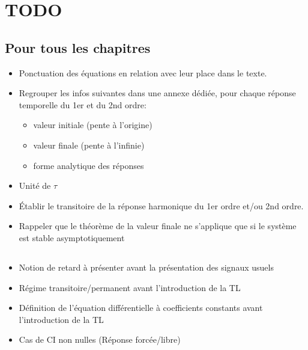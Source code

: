 \chapter{TODO}

\section*{Pour tous les chapitres}
\begin{itemize}
\item Ponctuation des équations en relation avec leur place dans le texte.
\item Regrouper les infos suivantes dans une annexe dédiée, pour chaque réponse temporelle du 1er et du 2nd ordre:
    \begin{itemize}
        \item valeur initiale (pente à l'origine)
        \item valeur finale (pente à l'infinie)
        \item forme analytique des réponses
    \end{itemize}
\item Unité de $\tau$
\item \'Etablir le transitoire de la réponse harmonique du 1er ordre et/ou 2nd ordre.
\item Rappeler que le théorème de la valeur finale ne s'applique que si le système est stable asymptotiquement
\end{itemize}

\section*{}     
\begin{itemize}
\item Notion de retard à présenter avant la présentation des signaux usuels
\item Régime transitoire/permanent avant l'introduction de la TL
\item Définition de l'équation différentielle à coefficients constants avant l'introduction de la TL
    \item Cas de CI non nulles (Réponse forcée/libre)
\end{itemize}
\section*{}
\section*{}
